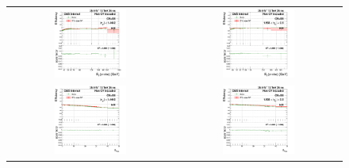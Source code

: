 \begin{figure}[bh]
  \begin{center}
    \begin{tabular}{cc}
      \includegraphics[width=0.45\textwidth]{figures/Zprime/2016/ScaleFactor/SameSign/N_1_eff/g_compare_cut_Et_Barrel_ea_ta_inc_AS_N_1_HoE_PUW.png} &
      \includegraphics[width=0.45\textwidth]{figures/Zprime/2016/ScaleFactor/SameSign/N_1_eff/g_compare_cut_Et_Endcap_ea_ta_inc_AS_N_1_HoE_PUW.png} \\
      \includegraphics[width=0.45\textwidth]{figures/Zprime/2016/ScaleFactor/SameSign/N_1_eff/g_compare_cut_nVtx_Barrel_ea_ta_inc_AS_N_1_HoE_PUW.png} &
      \includegraphics[width=0.45\textwidth]{figures/Zprime/2016/ScaleFactor/SameSign/N_1_eff/g_compare_cut_nVtx_Endcap_ea_ta_inc_AS_N_1_HoE_PUW.png} \\

\end{tabular}
\end{center}
\end{figure}
